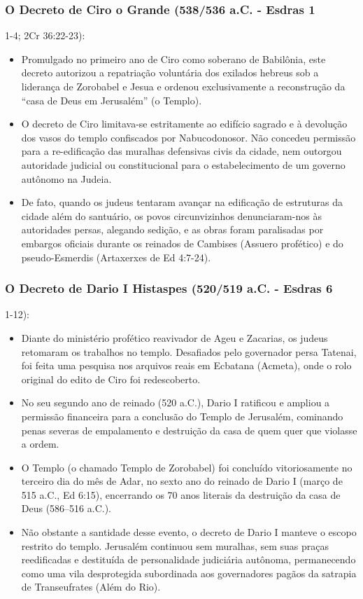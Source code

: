 \documentclass[11pt,a4paper,openany]{book}
\begin{document}
\subsubsection*{O Decreto de Ciro o Grande (538/536 a.C. - Esdras 1}
1-4; 2Cr 36:22-23):
\begin{itemize}
  \item Promulgado no primeiro ano de Ciro como soberano de Babilônia, este decreto autorizou a repatriação voluntária dos exilados hebreus sob a liderança de Zorobabel e Jesua e ordenou exclusivamente a reconstrução da ``casa de Deus em Jerusalém'' (o Templo).
  \item O decreto de Ciro limitava-se estritamente ao edifício sagrado e à devolução dos vasos do templo confiscados por Nabucodonosor. Não concedeu permissão para a re-edificação das muralhas defensivas civis da cidade, nem outorgou autoridade judicial ou constitucional para o estabelecimento de um governo autônomo na Judeia.
  \item De fato, quando os judeus tentaram avançar na edificação de estruturas da cidade além do santuário, os povos circunvizinhos denunciaram-nos às autoridades persas, alegando sedição, e as obras foram paralisadas por embargos oficiais durante os reinados de Cambises (Assuero profético) e do pseudo-Esmerdis (Artaxerxes de Ed 4:7-24).
\end{itemize}



\subsubsection*{O Decreto de Dario I Histaspes (520/519 a.C. - Esdras 6}
1-12):
\begin{itemize}
  \item Diante do ministério profético reavivador de Ageu e Zacarias, os judeus retomaram os trabalhos no templo. Desafiados pelo governador persa Tatenai, foi feita uma pesquisa nos arquivos reais em Ecbatana (Acmeta), onde o rolo original do edito de Ciro foi redescoberto.
  \item No seu segundo ano de reinado (520 a.C.), Dario I ratificou e ampliou a permissão financeira para a conclusão do Templo de Jerusalém, cominando penas severas de empalamento e destruição da casa de quem quer que violasse a ordem.
  \item O Templo (o chamado Templo de Zorobabel) foi concluído vitoriosamente no terceiro dia do mês de Adar, no sexto ano do reinado de Dario I (março de 515 a.C., Ed 6:15), encerrando os 70 anos literais da destruição da casa de Deus (586–516 a.C.).
  \item Não obstante a santidade desse evento, o decreto de Dario I manteve o escopo restrito do templo. Jerusalém continuou sem muralhas, sem suas praças reedificadas e destituída de personalidade judiciária autônoma, permanecendo como uma vila desprotegida subordinada aos governadores pagãos da satrapia de Transeufrates (Além do Rio).
\end{itemize}
\end{document}
